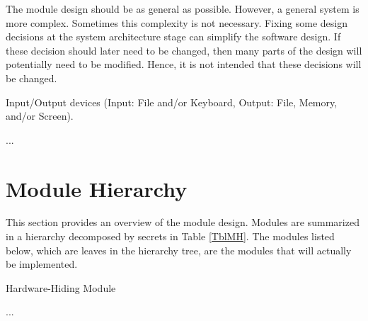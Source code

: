 \documentclass[12pt, titlepage]{article}
\newcounter{ucnum}
\newcommand{\uctheucnum}{UC\theucnum}
\newcounter{mnum}
\newcommand{\mthemnum}{M\themnum}
\begin{document}
The module design should be as general as possible. However, a general system is more complex.
Sometimes this complexity is not necessary. Fixing some design decisions at the system architecture
stage can simplify the software design. If these decision should later need to be changed, then
many parts of the design will potentially need to be modified. Hence, it is not intended that these
decisions will be changed.

\begin{description}
	\item[ \uctheucnum \label{ucIO}:] Input/Output devices
		(Input: File and/or Keyboard, Output: File, Memory, and/or Screen).
	\item ...
\end{description}

\section{Module Hierarchy} \label{SecMH}

This section provides an overview of the module design. Modules are summarized in a hierarchy
decomposed by secrets in Table \ref{TblMH}. The modules listed below, which are leaves in the
hierarchy tree, are the modules that will actually be implemented.

\begin{description}
	\item [ \mthemnum \label{mHH}:] Hardware-Hiding Module
	\item ...
\end{description}
\end{document}
